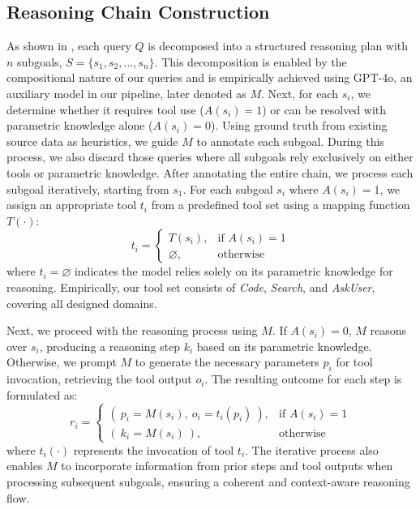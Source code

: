 \subsection{Reasoning Chain Construction}
As shown in , each query \( Q \) is decomposed into a structured reasoning plan with \( n \) subgoals, \( S = \{s_1, s_2, \dots, s_n\} \). This decomposition is enabled by the compositional nature of our queries and is empirically achieved using GPT-4o, an auxiliary model in our pipeline, later denoted as \( M \).
Next, for each \( s_i \), we determine whether it requires tool use (\( A(s_i) = 1 \)) or can be resolved with parametric knowledge alone (\( A(s_i) = 0 \)). Using ground truth from existing source data as heuristics, we guide \( M \) to annotate each subgoal. During this process, we also discard those queries where all subgoals rely exclusively on either tools or parametric knowledge.
After annotating the entire chain, we process each subgoal iteratively, starting from \( s_1 \). For each subgoal \( s_i \) where \( A(s_i) = 1 \), we assign an appropriate tool \( t_i \) from a predefined tool set using a mapping function \( T(\cdot) \):
\[
t_i =
\begin{cases} 
T(s_i), & \text{if } A(s_i) = 1 \\ 
\varnothing, & \text{otherwise} 
\end{cases}
\]
where \( t_i = \varnothing \) indicates the model relies solely on its parametric knowledge for reasoning. Empirically, our tool set consists of \textit{Code}, \textit{Search}, and \textit{AskUser}, covering all designed domains.

Next, we proceed with the reasoning process using \( M \). If \( A(s_i) = 0 \), \( M \) reasons over \( s_i \), producing a reasoning step \( k_i \) based on its parametric knowledge. Otherwise, we prompt \( M \) to generate the necessary parameters \( p_i \) for tool invocation, retrieving the tool output \( o_i \). The resulting outcome for each step is formulated as:
\[
r_i =
\begin{cases} 
(\ p_i = M(s_i),\ o_i = t_i(p_i)\ ), & \text{if } A(s_i) = 1 \\ 
(\ k_i = M(s_i)\ ), & \text{otherwise} 
\end{cases}
\]
where \( t_i(\cdot) \) represents the invocation of tool \( t_i \). The iterative process also enables \( M \) to incorporate information from prior steps and tool outputs when processing subsequent subgoals, ensuring a coherent and context-aware reasoning flow.

